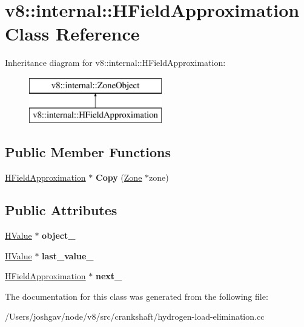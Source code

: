 \hypertarget{classv8_1_1internal_1_1_h_field_approximation}{}\section{v8\+:\+:internal\+:\+:H\+Field\+Approximation Class Reference}
\label{classv8_1_1internal_1_1_h_field_approximation}
Inheritance diagram for v8\+:\+:internal\+:\+:H\+Field\+Approximation\+:\begin{figure}[H]
\begin{center}
\leavevmode
\includegraphics[height=2.000000cm]{classv8_1_1internal_1_1_h_field_approximation}
\end{center}
\end{figure}
\subsection*{Public Member Functions}
\begin{DoxyCompactItemize}
\item 
\hyperlink{classv8_1_1internal_1_1_h_field_approximation}{H\+Field\+Approximation} $\ast$ {\bfseries Copy} (\hyperlink{classv8_1_1internal_1_1_zone}{Zone} $\ast$zone)\hypertarget{classv8_1_1internal_1_1_h_field_approximation_a670b121b7bc412e75ae29fb41433212a}{}\label{classv8_1_1internal_1_1_h_field_approximation_a670b121b7bc412e75ae29fb41433212a}

\end{DoxyCompactItemize}
\subsection*{Public Attributes}
\begin{DoxyCompactItemize}
\item 
\hyperlink{classv8_1_1internal_1_1_h_value}{H\+Value} $\ast$ {\bfseries object\+\_\+}\hypertarget{classv8_1_1internal_1_1_h_field_approximation_a6750e948b9c757737e93f69ac063bed7}{}\label{classv8_1_1internal_1_1_h_field_approximation_a6750e948b9c757737e93f69ac063bed7}

\item 
\hyperlink{classv8_1_1internal_1_1_h_value}{H\+Value} $\ast$ {\bfseries last\+\_\+value\+\_\+}\hypertarget{classv8_1_1internal_1_1_h_field_approximation_aeaa585d0829deffb35302b975071f329}{}\label{classv8_1_1internal_1_1_h_field_approximation_aeaa585d0829deffb35302b975071f329}

\item 
\hyperlink{classv8_1_1internal_1_1_h_field_approximation}{H\+Field\+Approximation} $\ast$ {\bfseries next\+\_\+}\hypertarget{classv8_1_1internal_1_1_h_field_approximation_ab61c7a4adb07c406f4de7f0273b2eaf9}{}\label{classv8_1_1internal_1_1_h_field_approximation_ab61c7a4adb07c406f4de7f0273b2eaf9}

\end{DoxyCompactItemize}


The documentation for this class was generated from the following file\+:\begin{DoxyCompactItemize}
\item 
/\+Users/joshgav/node/v8/src/crankshaft/hydrogen-\/load-\/elimination.\+cc\end{DoxyCompactItemize}
